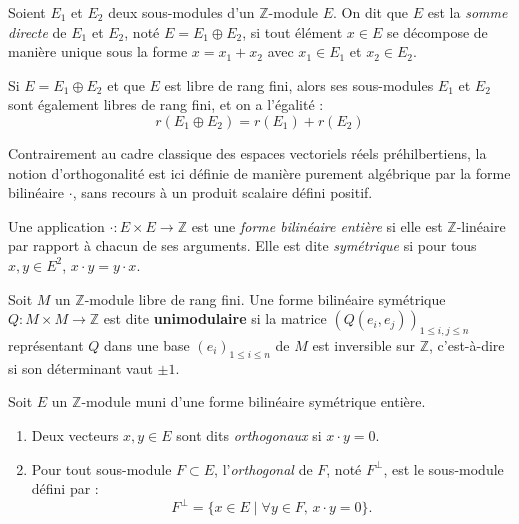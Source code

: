 \begin{definition}
Soient $E_1$ et $E_2$ deux sous-modules d'un $\mathbb{Z}$-module $E$. On dit que $E$ est la \emph{somme directe} de $E_1$ et $E_2$, noté $E = E_1 \oplus E_2$, si tout élément $x \in E$ se décompose de manière unique sous la forme $x = x_1 + x_2$ avec $x_1 \in E_1$ et $x_2 \in E_2$.
\end{definition}

\begin{proposition}
Si $E = E_1 \oplus E_2$ et que $E$ est libre de rang fini, alors ses sous-modules $E_1$ et $E_2$ sont également libres de rang fini, et on a l'égalité :
\[
r(E_1 \oplus E_2) = r(E_1) + r(E_2)
\]
\end{proposition}

Contrairement au cadre classique des espaces vectoriels réels préhilbertiens, la notion d'orthogonalité est ici définie de manière purement algébrique par la forme bilinéaire $\cdot$, sans recours à un produit scalaire défini positif. 


\begin{definition}
Une application $\cdot : E \times E \to \mathbb{Z}$ est une \emph{forme bilinéaire entière} si elle est $\mathbb{Z}$-linéaire par rapport à chacun de ses arguments. Elle est dite \emph{symétrique} si pour tous $x, y \in E^2$, $x \cdot y = y \cdot x$. 
\end{definition}

\begin{definition}
Soit $M$ un $\mathbb{Z}$-module libre de rang fini. Une forme bilinéaire symétrique $Q : M \times M \to \mathbb{Z}$ est dite \textbf{unimodulaire} si la matrice $(Q(e_i, e_j))_{1 \le i, j \le n}$ représentant $Q$ dans une base $(e_i)_{1 \le i \le n}$ de $M$ est inversible sur $\mathbb{Z}$, c'est-à-dire si son déterminant vaut $\pm 1$.
\end{definition}

\begin{definition}[Orthogonalité]
Soit $E$ un $\mathbb{Z}$-module muni d'une forme bilinéaire symétrique entière.
\begin{enumerate}
    \item Deux vecteurs $x, y \in E$ sont dits \emph{orthogonaux} si $x \cdot y = 0$.
    \item Pour tout sous-module $F \subset E$, l'\emph{orthogonal} de $F$, noté $F^\perp$, est le sous-module défini par :
    \[
    F^\perp = \{ x \in E \mid \forall y \in F, \, x \cdot y = 0 \}.
    \]
\end{enumerate}
\end{definition}

